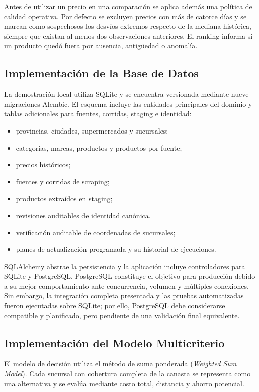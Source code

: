 Antes de utilizar un precio en una comparación se aplica además una política de
calidad operativa. Por defecto se excluyen precios con más de catorce días y se
marcan como sospechosos los desvíos extremos respecto de la mediana histórica,
siempre que existan al menos dos observaciones anteriores. El ranking informa
si un producto quedó fuera por ausencia, antigüedad o anomalía.

\subsection{Implementación de la Base de Datos}

La demostración local utiliza SQLite y se encuentra versionada mediante nueve
migraciones Alembic. El esquema incluye las entidades principales del dominio y
tablas adicionales para fuentes, corridas, staging e identidad:

\begin{itemize}
    \item provincias, ciudades, supermercados y sucursales;
    \item categorías, marcas, productos y productos por fuente;
    \item precios históricos;
    \item fuentes y corridas de scraping;
    \item productos extraídos en staging;
    \item revisiones auditables de identidad canónica.
    \item verificación auditable de coordenadas de sucursales;
    \item planes de actualización programada y su historial de ejecuciones.
\end{itemize}

SQLAlchemy abstrae la persistencia y la aplicación incluye controladores para
SQLite y PostgreSQL. PostgreSQL constituye el objetivo para producción debido a
su mejor comportamiento ante concurrencia, volumen y múltiples conexiones. Sin
embargo, la integración completa presentada y las pruebas automatizadas fueron
ejecutadas sobre SQLite; por ello, PostgreSQL debe considerarse compatible y
planificado, pero pendiente de una validación final equivalente.

\subsection{Implementación del Modelo Multicriterio}

El modelo de decisión utiliza el método de suma ponderada
(\textit{Weighted Sum Model}). Cada sucursal con cobertura completa de la
canasta se representa como una alternativa y se evalúa mediante costo total,
distancia y ahorro potencial.

